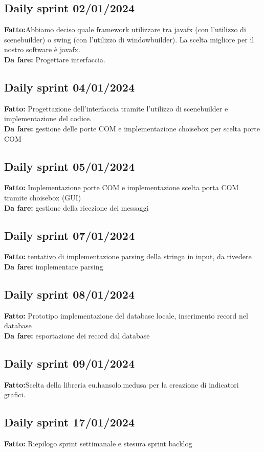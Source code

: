 \documentclass{report}
\begin{document}
\subsection*{Daily sprint 02/01/2024}
\textbf{Fatto:}Abbiamo deciso quale framework utilizzare tra javafx (con l'utilizzo di scenebuilder) o swing (con l'utilizzo di windowbuilder). La scelta migliore per il nostro software è javafx.\\
\textbf{Da fare:} Progettare interfaccia.

\subsection*{Daily sprint 04/01/2024}
\textbf{Fatto:} Progettazione dell'interfaccia tramite l'utilizzo di scenebuilder e implementazione del codice.\\
\textbf{Da fare:} gestione delle porte COM e implementazione choisebox per scelta porte COM
\subsection*{Daily sprint 05/01/2024}
\textbf{Fatto:} Implementazione porte COM e implementazione scelta porta COM tramite choisebox (GUI)\\
\textbf{Da fare:} gestione della ricezione dei messaggi

\subsection*{Daily sprint 07/01/2024}
\textbf{Fatto:} tentativo di implementazione parsing della stringa in input, da rivedere\\
\textbf{Da fare:} implementare parsing
\subsection*{Daily sprint 08/01/2024}
\textbf{Fatto:} Prototipo implementazione del database locale, inserimento record nel database\\
\textbf{Da fare:} esportazione dei record dal database
\subsection*{Daily sprint 09/01/2024}
\textbf{Fatto:}Scelta della libreria eu.hansolo.medusa per la creazione di indicatori grafici.\\

\subsection*{Daily sprint 17/01/2024}
\textbf{Fatto:} Riepilogo sprint settimanale e stesura sprint backlog\\\\
\end{document}
